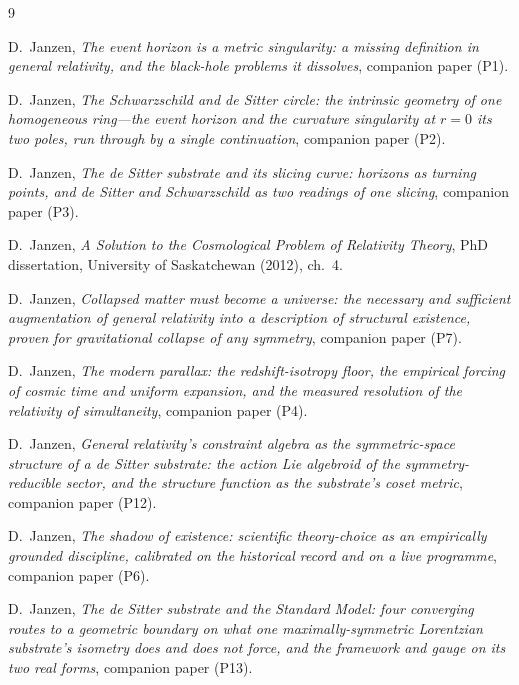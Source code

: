 \documentclass[11pt,a4paper]{article}
\theoremstyle{definition}
\begin{document}
\begin{thebibliography}{9}

D.~Janzen,
\emph{The event horizon is a metric singularity: a missing definition in general relativity, and the black-hole problems it dissolves}, companion paper (P1).

D.~Janzen,
\emph{The Schwarzschild and de Sitter circle: the intrinsic geometry of one homogeneous ring---the event horizon and the curvature singularity at $r=0$ its two poles, run through by a single continuation}, companion paper (P2).

D.~Janzen,
\emph{The de Sitter substrate and its slicing curve: horizons as turning points, and de Sitter and Schwarzschild as two readings of one slicing}, companion paper (P3).

 D.~Janzen, \emph{A Solution to the Cosmological Problem of Relativity Theory},
PhD dissertation, University of Saskatchewan (2012), ch.~4.

 D.~Janzen, \emph{Collapsed matter must become a universe: the necessary and sufficient augmentation of general relativity into a description of structural existence, proven for gravitational collapse of any symmetry}, companion paper (P7).

D.~Janzen,
\emph{The modern parallax: the redshift-isotropy floor, the empirical forcing of cosmic time and uniform expansion, and the measured resolution of the relativity of simultaneity}, companion paper (P4).

D.~Janzen,
\emph{General relativity's constraint algebra as the symmetric-space structure of a de Sitter substrate: the action Lie algebroid of the symmetry-reducible sector, and the structure function as the substrate's coset metric}, companion paper (P12).

D.~Janzen,
\emph{The shadow of existence: scientific theory-choice as an empirically grounded discipline, calibrated on the historical record and on a live programme}, companion paper (P6).

D.~Janzen,
\emph{The de Sitter substrate and the Standard Model: four converging routes to a geometric boundary on what one maximally-symmetric Lorentzian substrate's isometry does and does not force, and the framework and gauge on its two real forms}, companion paper (P13).


\end{thebibliography}
\end{document}
